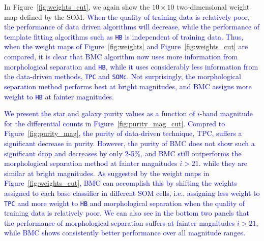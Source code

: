 \documentclass[useAMS,usenatbib]{mn2e}
\newcommand{\ie}{{i.e., }}
\begin{document}
In Figure~\ref{fig:weights_cut}, we again show the $10\times10$
two-dimensional weight map defined by the SOM.
\textcolor{blue}{When the quality of training data is relatively poor,
the performance of data driven algorithms will decrease,
while the performance of template fitting algorithms such as \texttt{HB}
is independent of training data.
Thus, when the weight maps of Figure~\ref{fig:weights}
and Figure~\ref{fig:weights_cut} are compared,
it is clear that
BMC algorithm now uses more information from
morphological separation and \texttt{HB},
while it uses considerably less information from the 
data-driven methods, \texttt{TPC} and \texttt{SOMc}.
Not surprisingly, the morphological separation method
performs best at bright magnitudes,
and BMC assigns more weight to \texttt{HB} at fainter magnitudes.}

\textcolor{blue}{We present the star and galaxy purity values as a function of
$i$-band magnitude for the differential counts
in Figure~\ref{fig:purity_mag_cut}.
Compred to Figure~\ref{fig:purity_mag},
the purity of data-driven technique, TPC, suffers a significant
decrease in purity.
However, the purity of BMC does not show such a significant drop
and decreases by only 2-5\%, and BMC still outperforms
the morphological separation method at fainter magnitudes $i > 21$.
while they are similar at bright magnitudes.
As suggested by the weight maps in Figure~\ref{fig:weights_cut},
BMC can accomplish this by shifting the weights assigned to
each base classifier in different SOM cells,
\ie assigning less weight to \texttt{TPC}
and more weight to \texttt{HB} and morphological separation
when the quality of training data is relatively poor.
We can also see in the bottom two panels that
the performance of morphological separation suffers
at fainter magnitudes $i > 21$,
while BMC shows consistently better performance over all magnitude ranges.}
\end{document}
